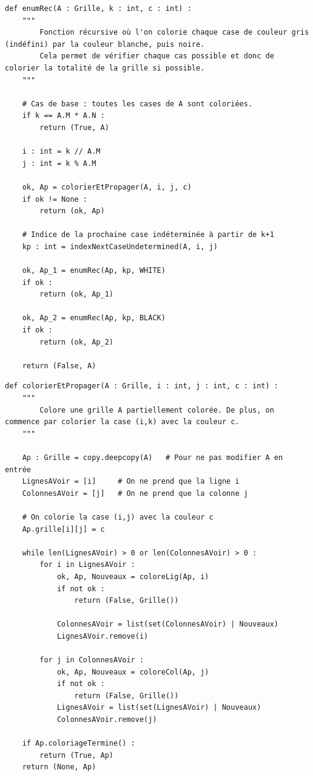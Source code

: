 \documentclass[a4paper,12pt]{article}
\begin{document}
\newpage

\begin{lstlisting}
def enumRec(A : Grille, k : int, c : int) :
    """
        Fonction récursive où l'on colorie chaque case de couleur gris (indéfini) par la couleur blanche, puis noire.
        Cela permet de vérifier chaque cas possible et donc de colorier la totalité de la grille si possible.
    """
    
    # Cas de base : toutes les cases de A sont coloriées.
    if k == A.M * A.N :
        return (True, A)
    
    i : int = k // A.M
    j : int = k % A.M
    
    ok, Ap = colorierEtPropager(A, i, j, c)
    if ok != None :
        return (ok, Ap)
    
    # Indice de la prochaine case indéterminée à partir de k+1
    kp : int = indexNextCaseUndetermined(A, i, j)
    
    ok, Ap_1 = enumRec(Ap, kp, WHITE)
    if ok :
        return (ok, Ap_1)
    
    ok, Ap_2 = enumRec(Ap, kp, BLACK)
    if ok :
        return (ok, Ap_2)
    
    return (False, A)
\end{lstlisting}

\newpage

\begin{lstlisting}
def colorierEtPropager(A : Grille, i : int, j : int, c : int) :
    """
        Colore une grille A partiellement colorée. De plus, on commence par colorier la case (i,k) avec la couleur c.
    """
    
    Ap : Grille = copy.deepcopy(A)   # Pour ne pas modifier A en entrée
    LignesAVoir = [i]     # On ne prend que la ligne i
    ColonnesAVoir = [j]   # On ne prend que la colonne j
    
    # On colorie la case (i,j) avec la couleur c
    Ap.grille[i][j] = c
    
    while len(LignesAVoir) > 0 or len(ColonnesAVoir) > 0 :
        for i in LignesAVoir :
            ok, Ap, Nouveaux = coloreLig(Ap, i)
            if not ok :
                return (False, Grille())
            
            ColonnesAVoir = list(set(ColonnesAVoir) | Nouveaux)
            LignesAVoir.remove(i)
         
        for j in ColonnesAVoir :
            ok, Ap, Nouveaux = coloreCol(Ap, j)
            if not ok :
                return (False, Grille())
            LignesAVoir = list(set(LignesAVoir) | Nouveaux)
            ColonnesAVoir.remove(j)
        
    if Ap.coloriageTermine() :
        return (True, Ap)
    return (None, Ap)
\end{lstlisting}
\end{document}
